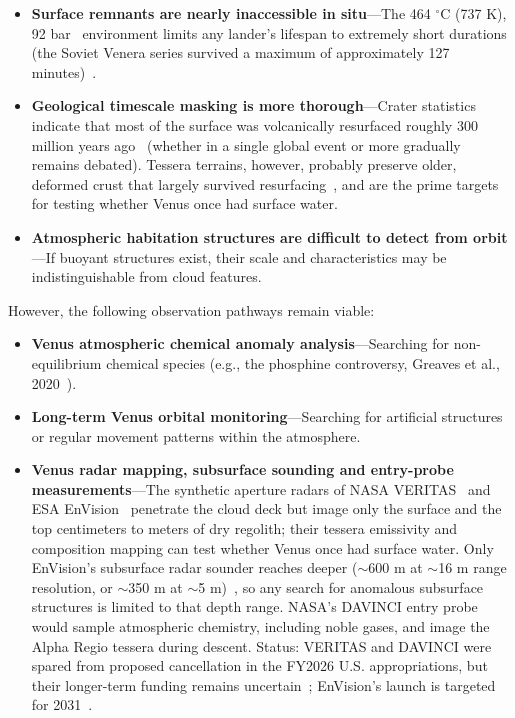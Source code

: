 \documentclass[aps,prd,twocolumn,superscriptaddress,nofootinbib]{revtex4-2}
\begin{document}
\begin{itemize}
  \item \textbf{Surface remnants are nearly inaccessible in situ}---The 464 $^{\circ}$C (737 K), 92 bar~\cite{NASA_Venus_Fact} environment limits any lander's lifespan to extremely short durations (the Soviet Venera series survived a maximum of approximately 127 minutes)~\cite{NASA_Venera13}.
  \item \textbf{Geological timescale masking is more thorough}---Crater statistics indicate that most of the surface was volcanically resurfaced roughly 300 million years ago~\cite{Strom1994} (whether in a single global event or more gradually remains debated). Tessera terrains, however, probably preserve older, deformed crust that largely survived resurfacing~\cite{Strom1994}, and are the prime targets for testing whether Venus once had surface water.
  \item \textbf{Atmospheric habitation structures are difficult to detect from orbit}---If buoyant structures exist, their scale and characteristics may be indistinguishable from cloud features.
\end{itemize}

However, the following observation pathways remain viable:

\begin{itemize}
  \item \textbf{Venus atmospheric chemical anomaly analysis}---Searching for non-equilibrium chemical species (e.g., the phosphine controversy, Greaves et al., 2020~\cite{Greaves2021}).
  \item \textbf{Long-term Venus orbital monitoring}---Searching for artificial structures or regular movement patterns within the atmosphere.
  \item \textbf{Venus radar mapping, subsurface sounding and entry-probe measurements}---The synthetic aperture radars of NASA VERITAS~\cite{NASA_VERITAS} and ESA EnVision~\cite{ESA_EnVision} penetrate the cloud deck but image only the surface and the top centimeters to meters of dry regolith; their tessera emissivity and composition mapping can test whether Venus once had surface water. Only EnVision's subsurface radar sounder reaches deeper (${\sim}$600 m at ${\sim}$16 m range resolution, or ${\sim}$350 m at ${\sim}$5 m)~\cite{ESA_EnVision_VESPER}, so any search for anomalous subsurface structures is limited to that depth range. NASA's DAVINCI entry probe~\cite{NASA_DAVINCI} would sample atmospheric chemistry, including noble gases, and image the Alpha Regio tessera during descent. Status: VERITAS and DAVINCI were spared from proposed cancellation in the FY2026 U.S. appropriations, but their longer-term funding remains uncertain~\cite{Richter2026}; EnVision's launch is targeted for 2031~\cite{ESA_EnVision}.
\end{itemize}
\end{document}

